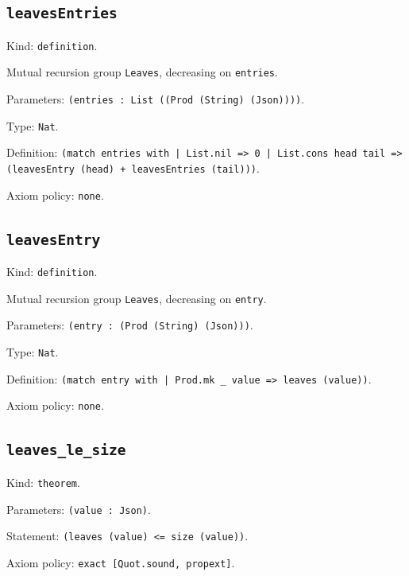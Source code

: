\documentclass[11pt]{article}
\begin{document}
\subsection*{\texttt{leavesEntries}}
\noindent Kind: \texttt{definition}.\par
\noindent Mutual recursion group \texttt{Leaves}, decreasing on \texttt{entries}.\par
\noindent Parameters: \texttt{(entries : List ((Prod (String) (Json))))}.\par
\noindent Type: \texttt{Nat}.\par
\noindent Definition: \texttt{(match entries with | List.nil => 0 | List.cons head tail => (leavesEntry (head) + leavesEntries (tail)))}.\par
\noindent Axiom policy: \texttt{none}.\par
\subsection*{\texttt{leavesEntry}}
\noindent Kind: \texttt{definition}.\par
\noindent Mutual recursion group \texttt{Leaves}, decreasing on \texttt{entry}.\par
\noindent Parameters: \texttt{(entry : (Prod (String) (Json)))}.\par
\noindent Type: \texttt{Nat}.\par
\noindent Definition: \texttt{(match entry with | Prod.mk \_ value => leaves (value))}.\par
\noindent Axiom policy: \texttt{none}.\par
\subsection*{\texttt{leaves\_le\_size}}
\noindent Kind: \texttt{theorem}.\par
\noindent Parameters: \texttt{(value : Json)}.\par
\noindent Statement: \texttt{(leaves (value) <= size (value))}.\par
\noindent Axiom policy: \texttt{exact [Quot.sound, propext]}.\par
\end{document}
